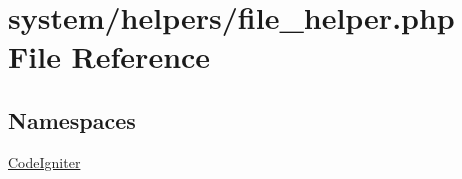 \hypertarget{file__helper_8php}{}\section{system/helpers/file\+\_\+helper.php File Reference}
\label{file__helper_8php}
\subsection*{Namespaces}
\begin{DoxyCompactItemize}
\item 
 \mbox{\hyperlink{namespace_code_igniter}{Code\+Igniter}}
\end{DoxyCompactItemize}
